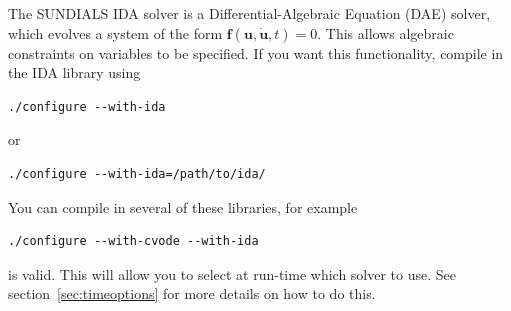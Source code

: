 \documentclass[12pt]{article}
\begin{document}
The SUNDIALS IDA solver is a Differential-Algebraic Equation (DAE) solver,
which evolves a system of the form $\mathbf{f}\left(\mathbf{u},
\dot{\mathbf{u}}, t\right) = 0$. This allows algebraic constraints on variables
to be specified. If you want this functionality, compile in the IDA library
using
%
\begin{verbatim}
./configure --with-ida
\end{verbatim}
%
or
%
\begin{verbatim}
./configure --with-ida=/path/to/ida/
\end{verbatim}
%
You can compile in several of these libraries, for example
%
\begin{verbatim}
./configure --with-cvode --with-ida
\end{verbatim}
%
is valid. This will allow you to select at run-time which solver to use. See
section~\ref{sec:timeoptions} for more details on how to do this.
\end{document}
